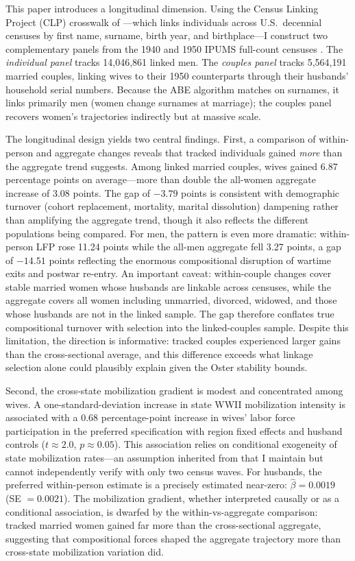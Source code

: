 \documentclass[12pt]{article}
\begin{document}
This paper introduces a longitudinal dimension. Using the Census Linking Project (CLP) crosswalk of \citet{abramitzky2025clp}---which links individuals across U.S.\ decennial censuses by first name, surname, birth year, and birthplace---I construct two complementary panels from the 1940 and 1950 IPUMS full-count censuses \citep{ruggles2024ipums}. The \textit{individual panel} tracks 14,046,861 linked men. The \textit{couples panel} tracks 5,564,191 married couples, linking wives to their 1950 counterparts through their husbands' household serial numbers. Because the ABE algorithm matches on surnames, it links primarily men (women change surnames at marriage); the couples panel recovers women's trajectories indirectly but at massive scale.

The longitudinal design yields two central findings. First, a comparison of within-person and aggregate changes reveals that tracked individuals gained \textit{more} than the aggregate trend suggests. Among linked married couples, wives gained 6.87 percentage points on average---more than double the all-women aggregate increase of 3.08 points. The gap of $-3.79$ points is consistent with demographic turnover (cohort replacement, mortality, marital dissolution) dampening rather than amplifying the aggregate trend, though it also reflects the different populations being compared. For men, the pattern is even more dramatic: within-person LFP rose 11.24 points while the all-men aggregate fell 3.27 points, a gap of $-14.51$ points reflecting the enormous compositional disruption of wartime exits and postwar re-entry. An important caveat: within-couple changes cover stable married women whose husbands are linkable across censuses, while the aggregate covers all women including unmarried, divorced, widowed, and those whose husbands are not in the linked sample. The gap therefore conflates true compositional turnover with selection into the linked-couples sample. Despite this limitation, the direction is informative: tracked couples experienced larger gains than the cross-sectional average, and this difference exceeds what linkage selection alone could plausibly explain given the Oster stability bounds.

Second, the cross-state mobilization gradient is modest and concentrated among wives. A one-standard-deviation increase in state WWII mobilization intensity is associated with a 0.68 percentage-point increase in wives' labor force participation in the preferred specification with region fixed effects and husband controls ($t \approx 2.0$, $p \approx 0.05$). This association relies on conditional exogeneity of state mobilization rates---an assumption inherited from \citet{acemoglu2004women} that I maintain but cannot independently verify with only two census waves. For husbands, the preferred within-person estimate is a precisely estimated near-zero: $\hat{\beta} = 0.0019$ (SE $= 0.0021$). The mobilization gradient, whether interpreted causally or as a conditional association, is dwarfed by the within-vs-aggregate comparison: tracked married women gained far more than the cross-sectional aggregate, suggesting that compositional forces shaped the aggregate trajectory more than cross-state mobilization variation did.
\end{document}
